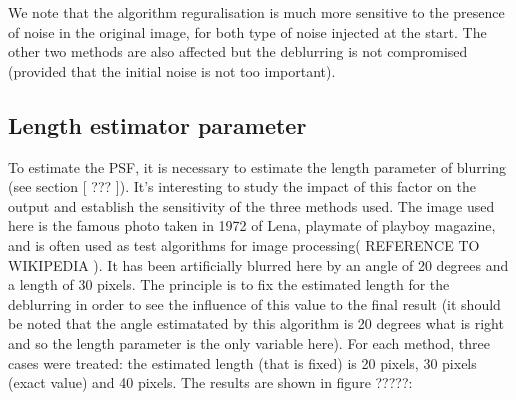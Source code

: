 We note that the algorithm reguralisation is much more sensitive to the presence of noise in the original image, for both type of noise injected at the start. The other two methods are also affected but the deblurring is not compromised (provided that the initial noise is not too important).


\subsection{Length estimator parameter}

To estimate the PSF, it is necessary to estimate the length parameter of blurring (see section [ ??? ]). It's interesting to study the impact of this factor on the output and establish the sensitivity of the three methods used.
The image used here is the famous photo taken in 1972 of Lena, playmate of playboy magazine, and is often used as test algorithms for image processing( REFERENCE TO WIKIPEDIA ). It has been artificially blurred here by an angle of 20 degrees and a length of 30 pixels. The principle is to fix the estimated length for the deblurring in order to see the influence of this value to the final result (it should be noted that the angle estimatated by this algorithm is 20 degrees what is right and so the length parameter is the only variable here). For each method, three cases were treated: the estimated length (that is fixed) is 20 pixels, 30 pixels (exact value) and 40 pixels.  The results are shown in figure ?????:

